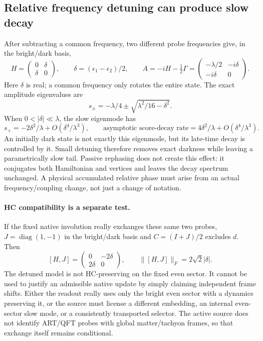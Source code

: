 \documentclass[11pt,a4paper]{article}
\begin{document}
\subsection{Relative frequency detuning can produce slow decay}

After subtracting a common frequency, two different probe frequencies
give, in the bright/dark basis,
\[
 H=\begin{pmatrix}0&\delta\\\delta&0\end{pmatrix},\qquad
 \delta=(\epsilon_1-\epsilon_2)/2,\qquad
 A=-iH-\tfrac12\Gamma
   =\begin{pmatrix}-\lambda/2&-i\delta\\-i\delta&0\end{pmatrix}.
\]
Here $\delta$ is real; a common frequency only rotates the entire
state. The exact amplitude eigenvalues are
\[
 s_\pm=-\lambda/4\pm\sqrt{\lambda^2/16-\delta^2}.
\]
When $0<|\delta|\ll\lambda$, the slow eigenmode has
\[
 s_+=-2\delta^2/\lambda+O(\delta^4/\lambda^3),
 \qquad \text{asymptotic score-decay rate}
       =4\delta^2/\lambda+O(\delta^4/\lambda^3).
\]
An initially dark state is not exactly this eigenmode, but its
late-time decay is controlled by it. Small detuning therefore
removes exact darkness while leaving a parametrically slow tail.
Passive rephasing does not create this effect: it conjugates both
Hamiltonian and vertices and leaves the decay spectrum unchanged.
A physical accumulated relative phase must arise from an actual
frequency/coupling change, not just a change of notation.

\paragraph{HC compatibility is a separate test.}
If the fixed native involution really exchanges these same two
probes, $J=\operatorname{diag}(1,-1)$ in the bright/dark basis and
$C=(I+J)/2$ excludes $d$. Then
\[
 [H,J]=\begin{pmatrix}0&-2\delta\\2\delta&0\end{pmatrix},
 \qquad \|[H,J]\|_F=2\sqrt2|\delta|.
\]
The detuned model is not HC-preserving on the fixed even sector.
It cannot be used to justify an admissible native update by simply
claiming independent frame shifts. Either the readout really uses
only the bright even sector with a dynamics preserving it, or the
source must license a different embedding, an internal even-sector
slow mode, or a consistently transported selector. The active
source does not identify ART/QFT probes with global matter/tachyon
frames, so that exchange itself remains conditional.
\end{document}
